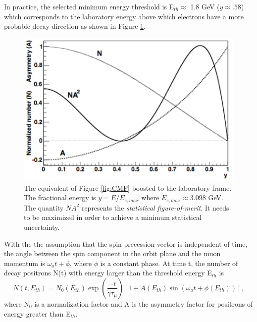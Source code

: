 \documentclass{outhesis}
\begin{document}
In practice, the selected minimum energy threshold is E$_{th}\approx$ 1.8 GeV ($y\approx.58$) which corresponds to the laboratory energy above which electrons have a more probable decay direction as shown in Figure \ref{fig:LAB}. 
\begin{figure}
  \centering
  \includegraphics[scale=0.5]{figures/LAB}
   \caption{The equivalent of Figure \ref{fig:CMF} boosted to the laboratory frame. The fractional energy is $y=E/E_{e,max}$ where $E_{e,max} \approx 3.098$ GeV. The quantity $NA^2$ represents the \emph{statistical figure-of-merit}. It needs to be maximized in order to achieve a minimum statistical uncertainty. \cite{bnl}}
  \label{fig:LAB}
\end{figure}
With the the assumption that the spin precession vector is independent of time, the angle between the spin component in the orbit plane and the muon momentum is $\omega_at+\phi$, where $\phi$ is a constant phase. At time t, the number of decay positrons N(t) with energy larger than the threshold energy E$_{th}$ is
\begin{equation}
N(t, E_{th}) = N_0(E_{th})\exp \left(\frac{-t}{\gamma \tau_{\mu}}\right) \left[1 + A(E_{th})  \sin\left(\omega_a t + \phi(E_{th})\right)\right],
\label{eq:fit}
\end{equation}
where N$_0$ is a normalization factor and A is the asymmetry factor for positrons of energy greater than E$_{th}$. 
\end{document}
